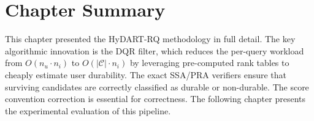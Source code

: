 \section{Chapter Summary}

This chapter presented the HyDART-RQ methodology in full detail. The key algorithmic innovation is the DQR filter, which reduces the per-query workload from $O(n_u \cdot n_i)$ to $O(|\mathcal{C}| \cdot n_i)$ by leveraging pre-computed rank tables to cheaply estimate user durability. The exact SSA/PRA verifiers ensure that surviving candidates are correctly classified as durable or non-durable. The score convention correction is essential for correctness. The following chapter presents the experimental evaluation of this pipeline.
